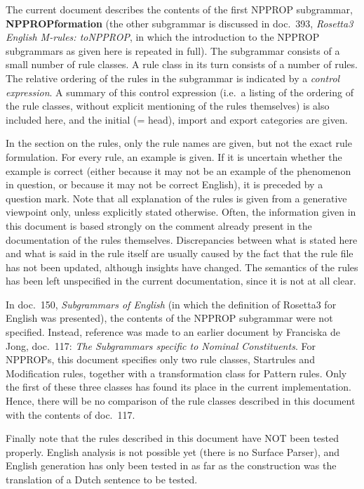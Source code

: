 The current document describes the contents of the first NPPROP subgrammar, 
{\bf NPPROPformation} (the other subgrammar is discussed in doc.\ 393, 
{\em Rosetta3 English M-rules: toNPPROP\/}, in which the introduction to the 
NPPROP subgrammars as given here is repeated in full).
The subgrammar consists of 
a small number of rule classes. A rule class in its turn
consists of a number of rules.
The relative ordering of the rules in the
subgrammar is indicated by a {\em control expression}. A summary of this
control expression (i.e.\ a listing of the ordering of the rule classes, 
without explicit mentioning of the rules themselves) is also included here, 
and the initial (= head), import and export categories are given. 

In the section on the rules, only the rule names are given, 
but not the exact rule formulation. For every rule, an 
example is given. If it is uncertain whether the example is correct (either 
because it may not be an example of the phenomenon in question, or because it 
may not be correct English), it is preceded by a question mark. Note that all 
explanation of the rules is given from a generative viewpoint
only, unless explicitly stated otherwise. Often, the information given in this 
document is based strongly on the comment already present in the documentation 
of the rules themselves. Discrepancies between what is stated here and what is 
said in the rule itself are usually caused by the fact that the rule file has 
not  been updated, although insights have changed. The semantics of the rules 
has been left unspecified in the current documentation, since it is not at all 
clear.

In doc.\ 150, {\em Subgrammars of English\/} (in which the definition of 
Rosetta3 for English was presented), the contents of the NPPROP subgrammar were 
not specified. Instead,
reference was made to an earlier document by Franciska de Jong, doc.\ 117: {\em 
The Subgrammars specific to Nominal Constituents\/}. For NPPROPs, this document 
specifies only two rule classes, Startrules and Modification rules, together 
with a transformation class for Pattern rules. Only the first of these three 
classes has found its place in the current implementation. Hence, there will be 
no comparison of the rule classes described in this document with the contents 
of doc.\ 117.

Finally note that the rules described in this document have NOT been tested 
properly. English analysis is not possible yet (there is no Surface Parser), and 
English generation has only been tested in as far as the construction was the 
translation of a Dutch sentence to be tested.

